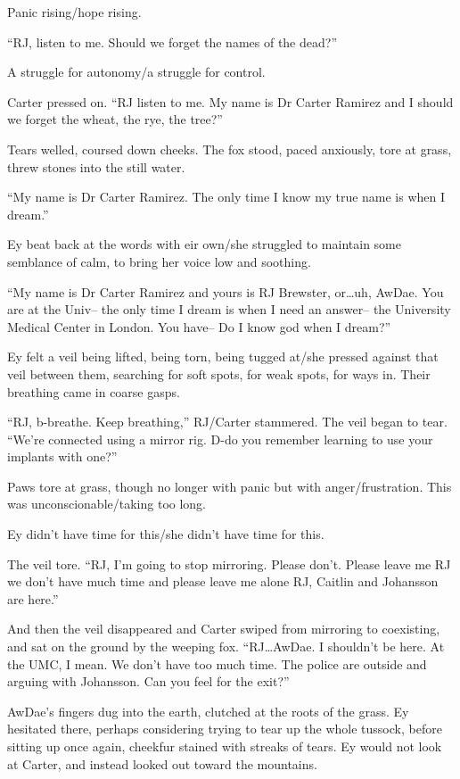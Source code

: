 Panic rising/hope rising.

``RJ, listen to me. Should we forget the names of the dead?''

A struggle for autonomy/a struggle for control.

Carter pressed on. ``RJ listen to me. My name is Dr Carter Ramirez and I should we forget the wheat, the rye, the tree?''

Tears welled, coursed down cheeks. The fox stood, paced anxiously, tore at grass, threw stones into the still water.

``My name is Dr Carter Ramirez. The only time I know my true name is when I dream.''

Ey beat back at the words with eir own/she struggled to maintain some semblance of calm, to bring her voice low and soothing.

``My name is Dr Carter Ramirez and yours is RJ Brewster, or\ldots{}uh, AwDae. You are at the Univ-- the only time I dream is when I need an answer-- the University Medical Center in London. You have-- Do I know god when I dream?''

Ey felt a veil being lifted, being torn, being tugged at/she pressed against that veil between them, searching for soft spots, for weak spots, for ways in. Their breathing came in coarse gasps.

``RJ, b-breathe. Keep breathing,'' RJ/Carter stammered. The veil began to tear. ``We're connected using a mirror rig. D-do you remember learning to use your implants with one?''

Paws tore at grass, though no longer with panic but with anger/frustration. This was unconscionable/taking too long.

Ey didn't have time for this/she didn't have time for this.

The veil tore. ``RJ, I'm going to stop mirroring. Please don't. Please leave me RJ we don't have much time and please leave me alone RJ, Caitlin and Johansson are here.''

And then the veil disappeared and Carter swiped from mirroring to coexisting, and sat on the ground by the weeping fox. ``RJ\ldots{}AwDae. I shouldn't be here. At the UMC, I mean. We don't have too much time. The police are outside and arguing with Johansson. Can you feel for the exit?''

AwDae's fingers dug into the earth, clutched at the roots of the grass. Ey hesitated there, perhaps considering trying to tear up the whole tussock, before sitting up once again, cheekfur stained with streaks of tears. Ey would not look at Carter, and instead looked out toward the mountains.

